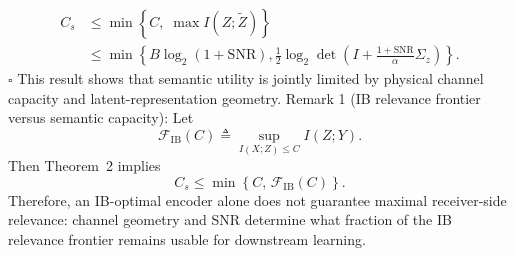 \documentclass[10pt,journal]{IEEEtran}
\begin{document}
\begin{equation}
\begin{aligned}
C_s
&\le \min\left\{C,\;\max I(Z;\tilde{Z})\right\} \\
&\le
\min\left\{
B\log_2(1+\mathrm{SNR}),
\frac{1}{2}\log_2\det\left(I+\frac{1+\mathrm{SNR}}{\alpha}\Sigma_z\right)
\right\}.
\end{aligned}
\end{equation}
\hfill $\square$
This result shows that semantic utility is jointly limited by physical channel capacity and latent-representation geometry.
Remark 1 (IB relevance frontier versus semantic capacity): Let
\begin{equation}
\mathcal{F}_{\mathrm{IB}}(C)
\triangleq
\sup_{I(X;Z)\le C} I(Z;Y).
\end{equation}
Then Theorem~2 implies
\begin{equation}
C_s
\le
\min\left\{C,\,\mathcal{F}_{\mathrm{IB}}(C)\right\}.
\end{equation}
Therefore, an IB-optimal encoder alone does not guarantee maximal receiver-side relevance: channel geometry and SNR determine what fraction of the IB relevance frontier remains usable for downstream learning.
\end{document}
